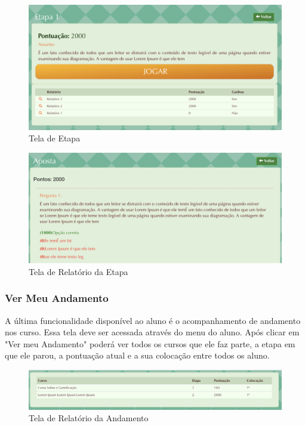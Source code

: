 \begin{figure}[H]
  \centering
  \includegraphics[scale=0.47]{images/proposta-img/Figura4-40.png}
  \caption{Tela de Etapa}
  \label{fig:Figura4-40}
\end{figure}

\begin{figure}[H]
  \centering
  \includegraphics[scale=0.44]{images/proposta-img/Figura4-41.png}
  \caption{Tela de Relatório da Etapa}
  \label{fig:Figura4-41}
\end{figure}

\subsubsection{Ver Meu Andamento}

A última funcionalidade disponível ao aluno é o acompanhamento de andamento nos curso. Essa tela deve ser acessada através do menu do aluno. Após clicar em "Ver meu Andamento" poderá ver todos os cursos que ele faz parte, a etapa em que ele parou, a pontuação atual e a sua colocação entre todos os aluno.

\begin{figure}[H]
  \centering
  \includegraphics[scale=0.46]{images/proposta-img/Figura4-42.png}
  \caption{Tela de Relatório da Andamento}
  \label{fig:Figura4-42}
\end{figure}